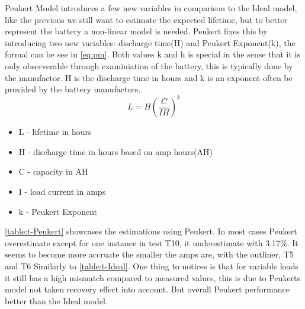 Peukert Model introduces a few new variables in comparison to the Ideal model, like the previous we still want to estimate the expected lifetime, but to better represent the battery a non-linear model is needed. Peukert fixes this by introducing two new variables: discharge time(H) and Peukert Exponent(k), the formal can be see in \cref{eq:pm}. Both values k and h is special in the sense that it is only observerable through examiniation of the battery, this is typically done by the manufactor. H is the discharge time in hours and k is an exponent often be provided by the battery manufactors.
\begin{equation}\label{eq:pm}
L=H(\frac{C}{IH})^k
\end{equation}
\begin{itemize}
	\item L - lifetime in hours
	\item H - discharge time in hours based on amp hours(AH)
	\item C - capacity in AH
	\item I - load current in amps
	\item k - Peukert Exponent
\end{itemize}

\cref{table:t-Peukert} showcases the estimations using Peukert. In most cases Peukert overestimate except for one instance in test T10, it underestimate with 3.17\%. It seems to become more accruate the smaller the amps are, with the outliner, T5 and T6 Similarly to \cref{table:t-Ideal}. One thing to notices is that for variable loads it still has a high mismatch compared to measured values, this is due to Peukerts model not taken recovery effect into account. But overall Peukert performance better than the Ideal model.

